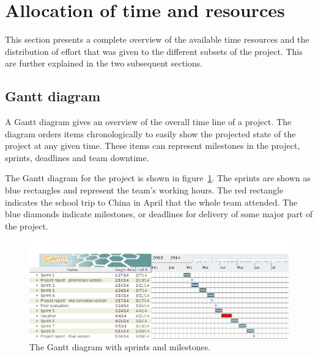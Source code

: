 \section{Allocation of time and resources}
This section presents a complete overview of the available time resources and the distribution of effort that was given to the different subsets of the project. This are further explained in the two subsequent sections.

\subsection{Gantt diagram}
\label{sec:gantt}

A Gantt diagram gives an overview of the overall time line of a project. The diagram orders items chronologically to easily show the projected state of the project at any given time. These items can represent milestones in the project, sprints, deadlines and team downtime. 

The Gantt diagram for the project is shown in figure~\ref{fig:gantt}. The sprints are shown as blue rectangles and represent the team's working hours. The red rectangle indicates the school trip to China in April that the whole team attended. The blue diamonds indicate milestones, or deadlines for delivery of some major part of the project.


\begin{figure}[H]
\includegraphics[width=\textwidth]{ch/projectManagement/fig/gantt.png}
\caption{The Gantt diagram with sprints and milestones.}
\label{fig:gantt}
\end{figure}
